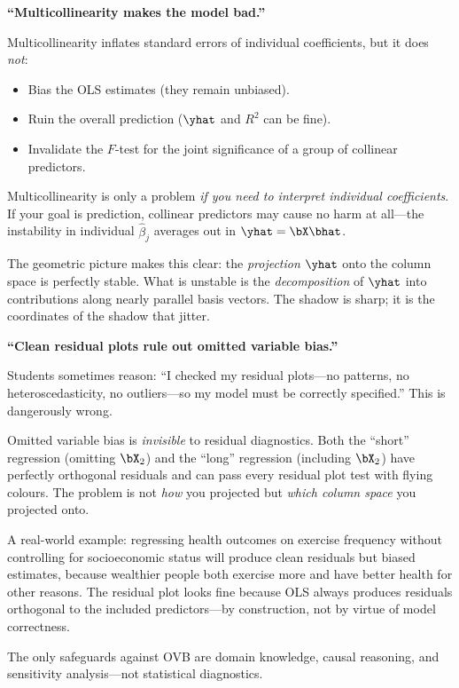 \begin{misconception}
\textbf{``Multicollinearity makes the model bad.''}

Multicollinearity inflates standard errors of individual coefficients,
but it does \emph{not}:
\begin{itemize}[nosep]
  \item Bias the OLS estimates (they remain unbiased).
  \item Ruin the overall prediction ($\yhat$ and $R^2$ can be fine).
  \item Invalidate the $F$-test for the joint significance of a group
        of collinear predictors.
\end{itemize}
Multicollinearity is only a problem \emph{if you need to interpret
individual coefficients}.
If your goal is prediction, collinear predictors may cause no harm
at all---the instability in individual $\hat{\beta}_j$ averages out in
$\yhat = \bX\bhat$.

The geometric picture makes this clear: the \emph{projection} $\yhat$
onto the column space is perfectly stable.
What is unstable is the \emph{decomposition} of $\yhat$ into
contributions along nearly parallel basis vectors.
The shadow is sharp; it is the coordinates of the shadow that jitter.
\end{misconception}



\begin{misconception}
\textbf{``Clean residual plots rule out omitted variable bias.''}

Students sometimes reason: ``I checked my residual plots---no patterns,
no heteroscedasticity, no outliers---so my model must be correctly
specified.'' This is dangerously wrong.

Omitted variable bias is \emph{invisible} to residual diagnostics.
Both the ``short'' regression (omitting $\bX_2$) and the ``long''
regression (including $\bX_2$) have perfectly orthogonal residuals and
can pass every residual plot test with flying colours.
The problem is not \emph{how} you projected but \emph{which column
space} you projected onto.

A real-world example: regressing health outcomes on exercise frequency
without controlling for socioeconomic status will produce clean residuals
but biased estimates, because wealthier people both exercise more
and have better health for other reasons.
The residual plot looks fine because OLS always produces residuals
orthogonal to the included predictors---by construction, not by
virtue of model correctness.

The only safeguards against OVB are domain knowledge, causal reasoning,
and sensitivity analysis---not statistical diagnostics.
\end{misconception}


